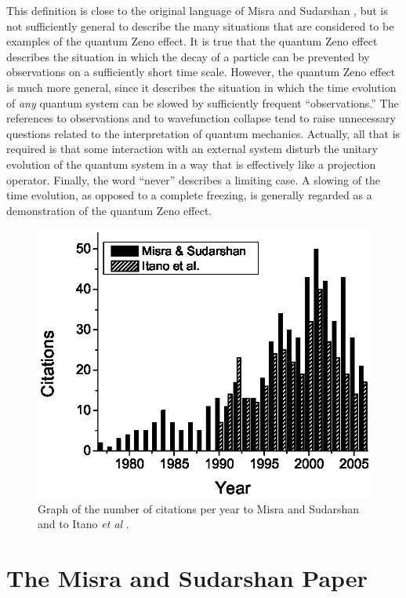 \documentclass[letterpaper]{jpconf}
\begin{document}
This definition is close to the original language of Misra and
Sudarshan \cite{misra77}, but is not sufficiently general to
describe the many situations that are considered to be examples of
the quantum Zeno effect. It is true that the quantum Zeno effect
describes the situation in which the decay of a particle can be
prevented by observations on a sufficiently short time scale.
However, the quantum Zeno effect is much more general, since it
describes the situation in which the time evolution of {\em any}
quantum system can be slowed by sufficiently frequent
``observations.''  The references to observations and to
wavefunction collapse tend to raise unnecessary questions related to
the interpretation of quantum mechanics. Actually, all that is
required is that some interaction with an external system disturb
the unitary evolution of the quantum system in a way that is
effectively like a projection operator. Finally, the word ``never''
describes a limiting case.  A slowing  of the time evolution, as
opposed to a complete freezing, is generally regarded as a
demonstration of the quantum Zeno effect.

\begin{figure}[htb]
\begin{center}
\includegraphics[width=5in]{cites_bw2.eps}
\end{center}
\caption{\label{citesfig}Graph of the number of citations per year
to Misra and Sudarshan  \cite{misra77} and to Itano {\em et al}
\cite{itano90}.}
\end{figure}


\section{The Misra and Sudarshan Paper}
\end{document}
